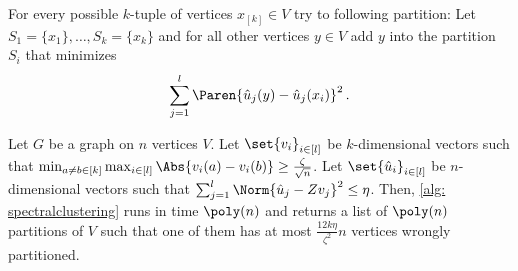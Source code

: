 \begin{algorithm}[H]
    \caption{Spectral partitioning algorithm (Based on Algorithm 10 of \cite{MR3536556-David16})}
    \label{alg: spectralclustering}
    \DontPrintSemicolon
    For every possible $k$-tuple of vertices $x_{[k]}\in V$ try to following partition:\;
    Let $S_1 = \{x_1\}, \ldots, S_k = \{ x_k\}$ and for all other vertices $y \in V$ add $y$ into the partition $S_{i}$ that minimizes
    \[
    \sum_{j=1}^l \Paren{\hat{u}_j(y)-\hat{u}_j(x_i)}^2\,.
    \]
\end{algorithm}


\begin{lemma}\label{lem:clusteringalmosteigenvectors}
    Let $G$ be a graph on $n$ vertices $V$. Let $\set{v_{i}}_{i \in [l]}$ be $k$-dimensional vectors such that $\min_{a\neq b\in[k]}\max_{i\in [l]} \Abs{v_i(a)-v_i(b)}\geq \frac{\zeta}{\sqrt{n}}$. Let $\set{\hat{u}_{i}}_{i \in [l]}$ be $n$-dimensional vectors such that $\sum_{j=1}^l \Norm{\hat{u}_j-Zv_j}^2\leq \eta$.
    Then, \cref{alg: spectralclustering} runs in time $\poly(n)$ and returns a list of $\poly(n)$ partitions of $V$ such that one of them has at most $\frac{12k\eta}{\zeta^2}n$ vertices wrongly partitioned.
\end{lemma}


